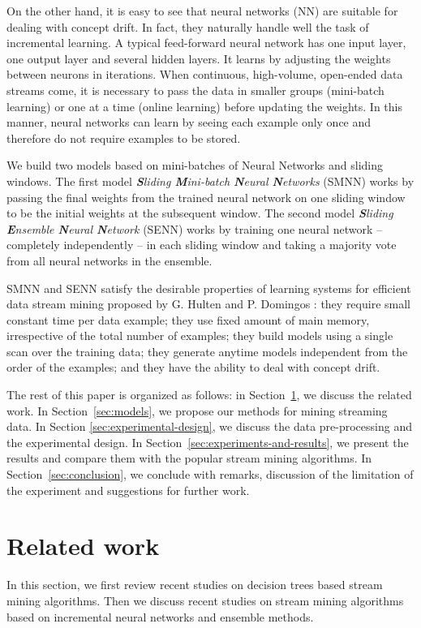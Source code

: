 \documentclass[conference]{IEEEtran}
\begin{document}
On the other hand, it is easy to see that neural networks (NN) are suitable for dealing with concept drift. In fact, they naturally handle well the task of incremental learning. A typical feed-forward neural network has one input layer, one output layer and several hidden layers. It learns by adjusting the weights between neurons in iterations. When continuous, high-volume, open-ended data streams come, it is necessary to pass the data in smaller groups (mini-batch learning) or one at a time (online learning) before updating the weights. In this manner, neural networks can learn by seeing each example only once and therefore do not require examples to be stored. 

We build two models based on mini-batches of Neural Networks and sliding windows.
The first model \emph{\textbf{S}liding \textbf{M}ini-batch  \textbf{N}eural \textbf{N}etworks} (SMNN) works by passing the final weights from the trained neural network on one sliding window to be the initial weights at the subsequent window. The second model \emph{\textbf{S}liding \textbf{E}nsemble  \textbf{N}eural \textbf{N}etwork} (SENN) works by training one neural network -- completely independently -- in each sliding window and taking a majority vote from all neural networks in the ensemble. 

SMNN and SENN satisfy the desirable properties of learning systems for efficient data stream mining proposed by G. Hulten and P. Domingos \cite{Domingos}: they require small constant time per data example; they use fixed amount of main memory, irrespective of the total number of examples; they build models using a single scan over the training data; they generate anytime models independent from the order of the examples; and they have the ability to deal with concept drift. 

The rest of this paper is organized as follows: in Section~\ref{sec:related-work}, we discuss the related work. In Section~\ref{sec:models}, we propose our methods for mining streaming data. In Section \ref{sec:experimental-design}, we discuss the data pre-processing and the experimental design. In Section~\ref{sec:experiments-and-results}, we present the results and compare them with the popular stream mining algorithms. In Section~\ref{sec:conclusion}, we conclude with remarks, discussion of the limitation of the experiment and suggestions for further work.

\section{Related work}
\label{sec:related-work}
In this section, we first review recent studies on decision trees based stream mining algorithms. Then we discuss recent studies on stream mining algorithms based on incremental neural networks and ensemble methods. 
\end{document}
